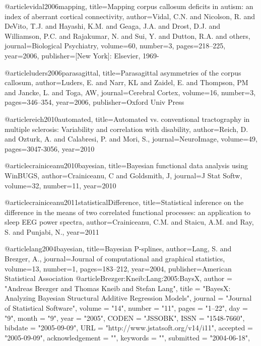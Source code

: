 @article{vidal2006mapping,
  title={Mapping corpus callosum deficits in autism: an index of aberrant cortical connectivity},
  author={Vidal, C.N. and Nicolson, R. and DeVito, T.J. and Hayashi, K.M. and Geaga, J.A. and Drost, D.J. and Williamson, P.C. and Rajakumar, N. and Sui, Y. and Dutton, R.A. and others},
  journal={Biological Psychiatry},
  volume={60},
  number={3},
  pages={218--225},
  year={2006},
  publisher={[New York]: Elsevier, 1969-}
}

@article{luders2006parasagittal,
  title={Parasagittal asymmetries of the corpus callosum},
  author={Luders, E. and Narr, KL and Zaidel, E. and Thompson, PM and Jancke, L. and Toga, AW},
  journal={Cerebral Cortex},
  volume={16},
  number={3},
  pages={346--354},
  year={2006},
  publisher={Oxford Univ Press}
}

@article{reich2010automated,
  title={Automated vs. conventional tractography in multiple sclerosis: Variability and
correlation with disability},
  author={Reich, D. and Ozturk, A. and Calabresi, P. and Mori, S.},
  journal={NeuroImage},
  volume={49},
  pages={3047-3056},
  year={2010}
}

@article{crainiceanu2010bayesian,
  title={Bayesian functional data analysis using WinBUGS},
  author={Crainiceanu, C and Goldsmith, J},
  journal={J Stat Softw},
  volume={32},
  number={11},
  year={2010}
}

@article{crainiceanu2011statisticalDifference,
  title={Statistical inference on the difference in the means of two correlated functional processes: an application to sleep EEG power spectra},
  author={Crainiceanu, C.M. and Staicu, A.M. and Ray, S. and Punjabi, N.},
  year={2011}
}


@article{lang2004bayesian,
  title={Bayesian P-splines},
  author={Lang, S. and Brezger, A.},
  journal={Journal of computational and graphical statistics},
  volume={13},
  number={1},
  pages={183--212},
  year={2004},
  publisher={American Statistical Association}
}
@article{Brezger:Kneib:Lang:2005:BaysX,
  author =	"Andreas Brezger and Thomas Kneib and Stefan Lang",
  title =	"BayesX: Analyzing Bayesian Structural Additive Regression Models",
  journal =	"Journal of Statistical Software",
  volume =	"14",
  number =	"11",
  pages =	"1--22",
  day =  	"9",
  month =	"9",
  year = 	"2005",
  CODEN =	"JSSOBK",
  ISSN = 	"1548-7660",
  bibdate =	"2005-09-09",
  URL =  	"http://www.jstatsoft.org/v14/i11",
  accepted =	"2005-09-09",
  acknowledgement = "",
  keywords =	"",
  submitted =	"2004-06-18",
}
